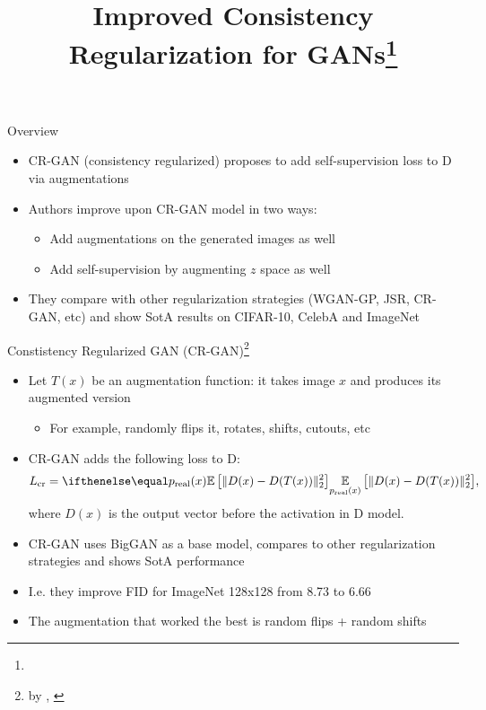 \documentclass[handout, 10pt]{beamer}
\title{Improved Consistency Regularization for GANs\footnote{\citepaper{improved_cr_for_gans}}}
\newcommand{\citepaper}[1]{\citetitle{#1} by \citeauthor{#1}, \citeyear{#1}}
\begin{document}
\begin{frame}
    \titlepage
\end{frame}

\begin{frame}{Overview}
\begin{itemize}
    \item\pause CR-GAN (consistency regularized) proposes to add self-supervision loss to D via augmentations
    \item\pause Authors improve upon CR-GAN model in two ways:
    \begin{itemize}
        \item\pause Add augmentations on the generated images as well
        \item\pause Add self-supervision by augmenting $z$ space as well
    \end{itemize}
    \item\pause They compare with other regularization strategies (WGAN-GP, JSR, CR-GAN, etc) and show SotA results on CIFAR-10, CelebA and ImageNet
\end{itemize}

\end{frame}


\begin{frame}{Constistency Regularized GAN (CR-GAN)\footnote{\citepaper{cr_gan}}}
\begin{itemize}
    \item\pause Let $T(x)$ be an augmentation function: it takes image $x$ and produces its augmented version
    \begin{itemize}
        \item\pause For example, randomly flips it, rotates, shifts, cutouts, etc
    \end{itemize}
    \item\pause CR-GAN adds the following loss to D:
    \begin{align*}
        L_\text{cr} = \expect[p_\text{real}(x)]{\| D(x) - D(T(x)) \|_2^2},
    \end{align*}
    where $D(x)$ is the output vector before the activation in D model.
    \item\pause CR-GAN uses BigGAN as a base model, compares to other regularization strategies and shows SotA performance
    \item\pause I.e. they improve FID for ImageNet 128x128 from 8.73 to 6.66
    \item\pause The augmentation that worked the best is random flips + random shifts 
\end{itemize}
\end{frame}
\end{document}
